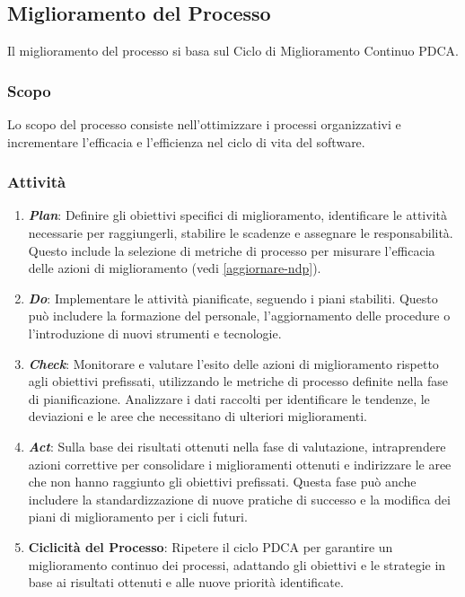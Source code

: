 \subsection{Miglioramento del Processo}

Il miglioramento del processo si basa sul Ciclo di Miglioramento Continuo PDCA.

\subsubsection{Scopo}
Lo scopo del processo consiste nell'ottimizzare i processi organizzativi e
incrementare l'efficacia e l'efficienza nel ciclo di vita del software.

\subsubsection{Attività}
\begin{enumerate}
	\item \textbf{\textit{Plan}}:
	      Definire gli obiettivi specifici di miglioramento, identificare le
	      attività necessarie per raggiungerli, stabilire le scadenze e
	      assegnare le responsabilità. Questo include la selezione di metriche
	      di processo per misurare l'efficacia delle azioni di miglioramento
	      (vedi \cref{aggiornare-ndp}).

	\item \textbf{\textit{Do}}:
	      Implementare le attività pianificate, seguendo i piani stabiliti.
	      Questo può includere la formazione del personale, l'aggiornamento
	      delle procedure o l'introduzione di nuovi strumenti e tecnologie.

	\item \textbf{\textit{Check}}:
	      Monitorare e valutare l'esito delle azioni di miglioramento rispetto
	      agli obiettivi prefissati, utilizzando le metriche di processo
	      definite nella fase di pianificazione. Analizzare i dati raccolti per
	      identificare le tendenze, le deviazioni e le aree che necessitano di
	      ulteriori miglioramenti.
	\item \textbf{\textit{Act}}:
	      Sulla base dei risultati ottenuti nella fase di valutazione,
	      intraprendere azioni correttive per consolidare i miglioramenti
	      ottenuti e indirizzare le aree che non hanno raggiunto gli obiettivi
	      prefissati. Questa fase può anche includere la standardizzazione di
	      nuove pratiche di successo e la modifica dei piani di miglioramento
	      per i cicli futuri.

	\item \textbf{Ciclicità del Processo}:
	      Ripetere il ciclo PDCA per garantire un miglioramento continuo dei
	      processi, adattando gli obiettivi e le strategie in base ai risultati
	      ottenuti e alle nuove priorità identificate.
\end{enumerate}
